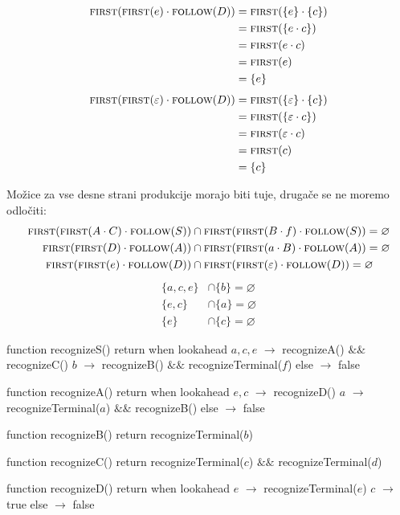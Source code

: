 \documentclass{report}
\newcommand{\Empty}{\varnothing}
\newcommand{\Null}{\varepsilon}
\newcommand{\Seq}{\cdot}
\newcommand{\FIRST}{\textsc{first}}
\newcommand{\FOLLOW}{\textsc{follow}}
\newlength{\arrow}
\newcommand{\NT}[1]{{#1}}
\newcommand{\T}[1]{{#1}}
\begin{document}
      \begin{align*}
        \FIRST(\FIRST(\T{e}) \Seq \FOLLOW(\NT{D})) &= \FIRST(\{\T{e}\} \Seq \{\T{c}\})\\
        &= \FIRST(\{\T{e} \Seq \T{c}\})\\
        &= \FIRST(\T{e} \Seq \T{c})\\ 
        &= \FIRST(\T{e})\\
        &= \{\T{e}\}
      \end{align*}
      \begin{align*}
        \FIRST(\FIRST(\Null) \Seq \FOLLOW(\NT{D})) &= \FIRST(\{\Null\} \Seq \{\T{c}\})\\
        &= \FIRST(\{\Null \Seq \T{c}\})\\
        &= \FIRST(\Null \Seq \T{c})\\ 
        &= \FIRST(\T{c})\\
        &= \{\T{c}\}
      \end{align*}

      Možice za vse desne strani produkcije morajo biti tuje, drugače se ne moremo odločiti:
      \begin{align*}
        \FIRST(\FIRST(\NT{A} \Seq \NT{C}) \Seq \FOLLOW(\NT{S})) &\cap \FIRST(\FIRST(\NT{B} \Seq \T{f}) \Seq \FOLLOW(\NT{S})) = \Empty\\
        \FIRST(\FIRST(\NT{D}) \Seq \FOLLOW(\NT{A})) &\cap \FIRST(\FIRST(\T{a} \Seq \NT{B}) \Seq \FOLLOW(\NT{A})) = \Empty\\
        \FIRST(\FIRST(\T{e}) \Seq \FOLLOW(\NT{D})) &\cap \FIRST(\FIRST(\Null) \Seq \FOLLOW(\NT{D})) = \Empty
      \end{align*}
      \begin{align*}
        \{\T{a}, \T{c}, \T{e}\} &\cap \{\T{b}\} = \Empty\\
        \{\T{e}, \T{c}\} &\cap \{\T{a}\} = \Empty\\
        \{\T{e}\} &\cap \{\T{c}\} = \Empty
      \end{align*}

      \begin{algorithm}
        function recognizeS()
          return when lookahead
            $\T{a}, \T{c}, \T{e}$ $\rightarrow$ recognizeA() $\&\&$ recognizeC()
            $\T{b}$ $\rightarrow$ recognizeB() $\&\&$ recognizeTerminal($\T{f}$)
            else $\rightarrow$ false

        function recognizeA()
          return when lookahead
            $\T{e}, \T{c}$ $\rightarrow$ recognizeD()
            $\T{a}$ $\rightarrow$ recognizeTerminal($\T{a}$) $\&\&$ recognizeB()
            else $\rightarrow$ false

        function recognizeB()
          return recognizeTerminal($\T{b}$)

        function recognizeC()
          return recognizeTerminal($\T{c}$) $\&\&$ recognizeTerminal($\T{d}$)

        function recognizeD()
          return when lookahead
            $\T{e}$ $\rightarrow$ recognizeTerminal($\T{e}$)
            $\T{c}$ $\rightarrow$ true
            else $\rightarrow$ false
      \end{algorithm}
\end{document}
